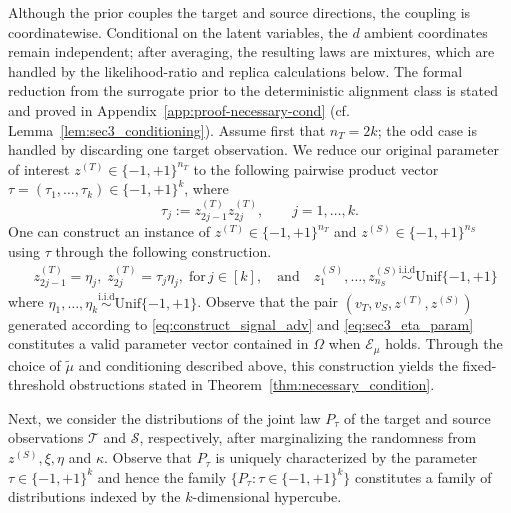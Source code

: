 \documentclass[10pt]{article}
\newcommand{\simiid}{\overset{\mathrm{i.i.d}}{\sim}}
\newcommand{\wt}{\widetilde}
\newcommand{\calT}{\mathcal T}
\newcommand{\trg}{T}
\newcommand{\nT}{n_{\trg}}
\newcommand{\ztar}{z^{(\trg)}}
\newcommand{\calS}{\mathcal S}
\newcommand{\src}{S}
\newcommand{\nS}{n_{\src}}
\newcommand{\zsrc}{z^{(\src)}}
\begin{document}
Although the prior couples the target and source directions, the coupling is coordinatewise. Conditional on the latent variables, the $d$ ambient coordinates remain independent; after averaging, the resulting laws are mixtures, which are handled by the likelihood-ratio and replica calculations below. The formal reduction from the surrogate prior to the deterministic alignment class is stated and proved in Appendix~\ref{app:proof-necessary-cond} (cf. Lemma~\ref{lem:sec3_conditioning}).
Assume first that $\nT=2k$; the odd case is handled by discarding one target observation. We reduce our original parameter of interest $\ztar \in \{-1,+1\}^{\nT}$ to the following pairwise product vector 
$\tau=(\tau_1,\ldots,\tau_k)\in\{-1,+1\}^k$, where
\begin{equation}
    \label{eq:sec3_tau}
    \tau_j:=\ztar_{2j-1}\ztar_{2j},
    \qquad j=1,\ldots,k.
\end{equation}
One can construct an instance of $\ztar \in \{-1,+1\}^{\nT}$ and $\zsrc \in \{-1,+1\}^{\nS}$ using $\tau$ through the following construction.
\begin{align}
\label{eq:sec3_eta_param}
&\ztar_{2j-1}=\eta_j,\; \ztar_{2j}=\tau_j\eta_j,
\; \text{for}\, j\in [k],\quad \mbox{and} \quad\zsrc_1,\ldots,\zsrc_{\nS} \simiid \mathrm{Unif}\{-1,+1\}
\end{align}
where $\eta_1,\ldots,\eta_k \simiid \mathrm{Unif}\{-1,+1\}$. Observe that the pair $(v_\trg,v_\src,\ztar,\zsrc)$ generated according to \eqref{eq:construct_signal_adv} and \eqref{eq:sec3_eta_param} constitutes a valid parameter vector contained in $\Omega$ when $\mathcal E_{\mu}$ holds. Through the choice of $\wt \mu$ and conditioning described above, this construction yields the fixed-threshold obstructions stated in Theorem~\ref{thm:necessary_condition}.

Next, we consider the distributions of the joint law $P_\tau$ of the target and source observations $\calT$ and $\calS$, respectively, after marginalizing the randomness from $\zsrc,\xi,\eta$ and $\kappa$. 
Observe that $P_\tau$ is uniquely characterized by the parameter $\tau \in \{-1,+1\}^k$ and hence the family $\{P_\tau:\tau \in \{-1,+1\}^{k}\}$ constitutes a family of distributions indexed by the $k$-dimensional hypercube.
\end{document}
